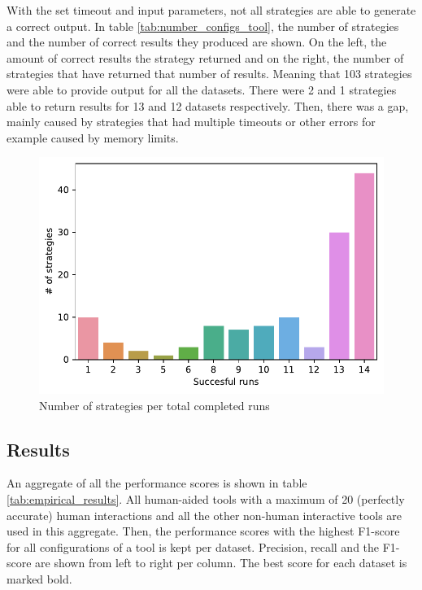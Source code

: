 With the set timeout and input parameters, not all strategies are able to generate a correct output. In table \ref{tab:number_configs_tool}, the number of strategies and the number of correct results they produced are shown. On the left, the amount of correct results the strategy returned and on the right, the number of strategies that have returned that number of results. Meaning that 103 strategies were able to provide output for all the datasets. There were 2 and 1 strategies able to return results for 13 and 12 datasets respectively. Then, there was a gap, mainly caused by strategies that had multiple timeouts or other errors for example caused by memory limits.

\begin{figure}
    \centering
    \includegraphics[width=0.8\linewidth]{thesis/Figures/RQ2/SuccesfulRuns.pdf}
    \caption{Number of strategies per total completed runs}
    \label{fig:number_configs_runs}
\end{figure}

\subsection{Results}
An aggregate of all the performance scores is shown in table \ref{tab:empirical_results}. All human-aided tools with a maximum of 20 (perfectly accurate) human interactions and all the other non-human interactive tools are used in this aggregate. Then, the performance scores with the highest F1-score for all configurations of a tool is kept per dataset. Precision, recall and the F1-score are shown from left to right per column. The best score for each dataset is marked bold.


